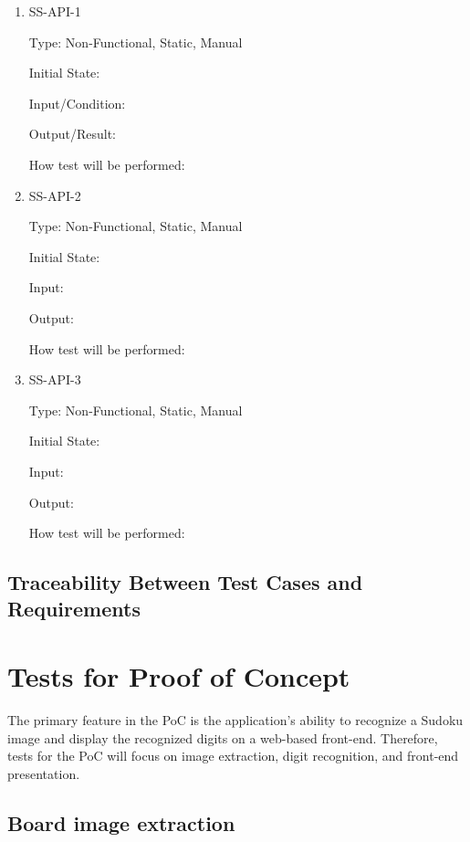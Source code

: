 \documentclass[11pt]{article}
\begin{document}
\begin{enumerate}

\item{SS-API-1\\}

Type: Non-Functional, Static, Manual
					
Initial State: 
					
Input/Condition: 
					
Output/Result: 
					
How test will be performed: 
					
\item{SS-API-2\\}

Type: Non-Functional, Static, Manual
					
Initial State: 
					
Input: 
					
Output: 
					
How test will be performed: 

\item{SS-API-3\\}

Type: Non-Functional, Static, Manual
					
Initial State: 
					
Input: 
					
Output: 
					
How test will be performed:

\end{enumerate}

\subsection{Traceability Between Test Cases and Requirements}

\section{Tests for Proof of Concept}

The primary feature in the PoC is the application's ability to recognize a Sudoku image and display the recognized digits on a web-based front-end. Therefore, tests for the PoC will focus on image extraction, digit recognition, and front-end presentation.

\subsection{Board image extraction}
		
\end{document}
